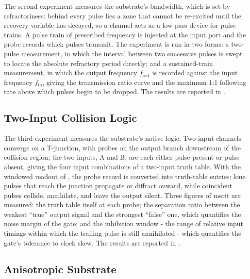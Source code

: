 The second experiment measures the substrate's bandwidth, which is set by refractoriness: behind every pulse lies a zone that cannot be re-excited until the recovery variable has decayed, so a channel acts as a low-pass device for pulse trains. 
A pulse train of prescribed frequency is injected at the input port and the probe records which pulses transmit. 
The experiment is run in two forms: a two-pulse measurement, in which the interval between two successive pulses is swept to locate the absolute refractory period directly; and a sustained-train measurement, in which the output frequency $f_{\mathrm{out}}$ is recorded against the input frequency $f_{\mathrm{in}}$, giving the transmission ratio curve and the maximum 1:1 following rate above which pulses begin to be dropped. 
The results are reported in .

\subsection{Two-Input Collision Logic}
\label{sec:meth_exp_logic}

The third experiment measures the substrate's native logic. 
Two input channels converge on a T-junction, with probes on the output branch downstream of the collision region; the two inputs, A and B, are each either pulse-present or pulse-absent, giving the four input combinations of a two-input truth table. 
With the windowed readout of , the probe record is converted into truth-table entries: lone pulses that reach the junction propagate or diffract onward, while coincident pulses collide, annihilate, and leave the output silent. 
Three figures of merit are measured: the truth table itself at each probe; the separation ratio between the weakest ``true'' output signal and the strongest ``false'' one, which quantifies the noise margin of the gate; and the inhibition window - the range of relative input timings within which the trailing pulse is still annihilated - which quantifies the gate's tolerance to clock skew. 
The results are reported in .

\subsection{Anisotropic Substrate}
\label{sec:meth_exp_anisotropy}

